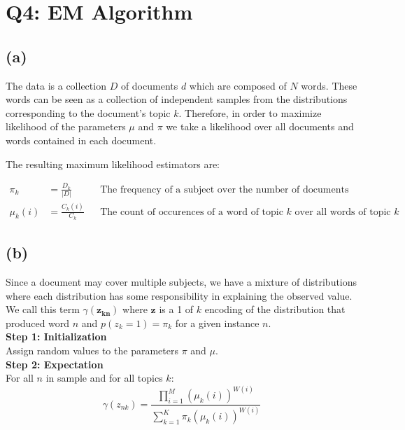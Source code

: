 \documentclass[11pt]{amsart}
\newcommand{\vek}[1]{\mathbf{#1}}
\begin{document}
\section{Q4: EM Algorithm}

\subsection{(a)}

The data is a collection $D$ of documents $d$ which are composed of $N$ words. These words can be seen as a collection of independent samples from the distributions corresponding to the document's topic $k$. Therefore, in order to maximize likelihood of the parameters $\mu$ and $\pi$ we take a likelihood over all documents and words contained in each document.

The resulting maximum likelihood estimators are:

\begin{equation}
\begin{aligned}
\pi_{k} &= \frac{D_k}{\vert D \vert} && \text{The frequency of a subject over the number of documents} \\
\mu_{k}(i) &= \frac{C_{k}(i)}{C_{k}} && \text{The count of occurences of a word of topic $k$ over all words of topic $k$}
\end{aligned}
\end{equation}

\subsection{(b)}

Since a document may cover multiple subjects, we have a mixture of distributions where each distribution has some responsibility in explaining the observed value. We call this term $\gamma(\vek{z_{kn}})$ where $\vek{z}$ is a 1 of $k$ encoding of the distribution that produced word $n$ and $p(z_{k} = 1) = \pi_k$ for a given instance $n$.\\

{\bf Step 1: Initialization}\\

Assign random values to the parameters $\pi$ and $\mu$.\\

{\bf Step 2: Expectation} \\
For all $n$ in sample and for all topics $k$: \\
\begin{equation}
\gamma(z_{nk}) = \frac{\prod_{i=1}^{M} (\mu_{k}(i))^{W(i)}}{\sum_{k=1}^{K} \pi_k (\mu_{k}(i))^{W(i)}}
\end{equation}
\end{document}
